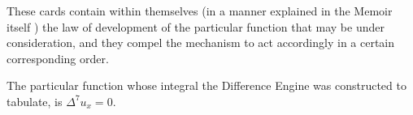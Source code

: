 These cards contain within themselves (in a manner explained in the Memoir 
itself \cite{menabrea_sketch_1842}) the law of development of the particular 
function that may be under consideration, and they compel the mechanism to act
accordingly in a certain corresponding order.

The particular function whose integral the Difference Engine was constructed to
tabulate, is $\Delta^7u_x=0$.
